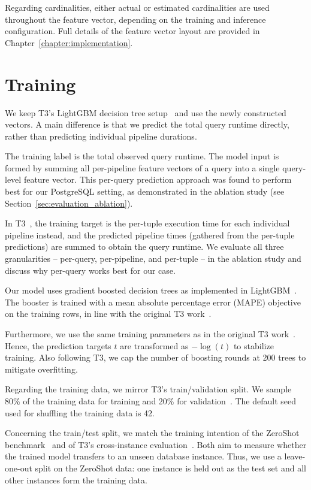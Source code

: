 Regarding cardinalities, either actual or estimated cardinalities are used throughout the feature vector, depending on the training and inference configuration.
Full details of the feature vector layout are provided in Chapter~\ref{chapter:implementation}.


\section{Training}

We keep T3's LightGBM decision tree setup~\parencite{t3} and use the newly constructed vectors.
A main difference is that we predict the total query runtime directly,
rather than predicting individual pipeline durations.

The training label is the total observed query runtime.
The model input is formed by summing all per-pipeline feature vectors of a query
into a single query-level feature vector.
This per-query prediction approach was found to perform best for our PostgreSQL setting,
as demonstrated in the ablation study (see Section~\ref{sec:evaluation_ablation}).

In T3~\parencite{t3}, the training target is the per-tuple execution time for each individual pipeline instead,
and the predicted pipeline times (gathered from the per-tuple predictions) are summed to obtain the query runtime.
We evaluate all three granularities -- per-query, per-pipeline, and per-tuple --
in the ablation study and discuss why per-query works best for our case.

Our model uses gradient boosted decision trees as implemented in LightGBM~\parencite{lightgbm}.
The booster is trained with a mean absolute percentage error (MAPE) objective on the training rows,
in line with the original T3 work~\parencite{t3}.

Furthermore, we use the same training parameters as in the original T3 work~\parencite{t3}.
Hence, the prediction targets $t$ are transformed as $-\log(t)$ to stabilize training.
Also following T3, we cap the number of boosting rounds at 200 trees to mitigate overfitting.

Regarding the training data, we mirror T3's train/validation split.
We sample 80\% of the training data for training and 20\% for validation~\parencite{t3}.
The default seed used for shuffling the training data is 42.

Concerning the train/test split, we match the training intention of the ZeroShot benchmark~\parencite{zeroshot} and of T3's cross-instance evaluation~\parencite{t3}.
Both aim to measure whether the trained model transfers to an unseen database instance.
Thus, we use a leave-one-out split on the ZeroShot data:
one instance is held out as the test set and all other instances form the training data.


